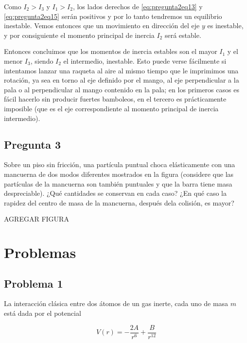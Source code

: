 \documentclass[a4paper,10pt]{article}
\numberwithin{equation}{section}
\begin{document}
Como $I_2 > I_3$ y $I_1 > I_2$, los lados derechos de \eqref{eq:pregunta2eq13} y 
\eqref{eq:pregunta2eq15} serán positivos y por lo tanto tendremos un equilibrio 
inestable. Vemos entonces que un movimiento en dirección del eje $y$ es inestable, 
y por consiguiente el momento principal de inercia $I_2$ será estable. 

\vspace{.3cm}

Entonces concluimos que los momentos de inercia estables son el mayor $I_1$ y 
el menor $I_3$, siendo $I_2$ el intermedio, inestable. Esto puede verse fácilmente 
si intentamos lanzar una raqueta al aire al mismo tiempo que le imprimimos una 
rotación, ya sea en torno al eje definido por el mango, al eje perpendicular a la 
pala o al perpendicular al mango contenido en la pala; en los primeros casos es 
fácil hacerlo sin producir fuertes bamboleos, en el tercero es prácticamente 
imposible (que es el eje correspondiente al momento principal de inercia intermedio).

\subsection{Pregunta 3}

Sobre un piso sin fricción, una partícula puntual choca elásticamente con una mancuerna de dos 
modos diferentes mostrados en la figura (considere que las partículas de la mancuerna son también
puntuales y que la barra tiene masa despreciable). ¿Qué cantidades se conservan en cada caso? 
¿En qué caso la rapidez del centro de masa de la mancuerna, después dela colisión, es mayor?

\vspace{.3cm}

AGREGAR FIGURA

\vspace{.3cm}

\section{Problemas}

\subsection{Problema 1}

La interacción clásica entre dos átomos de un gas inerte, cada uno de masa $m$ está dada por el
potencial 

$$
V(r) = - \frac{2A}{r^6} + \frac{B}{r^12}
$$
\end{document}
